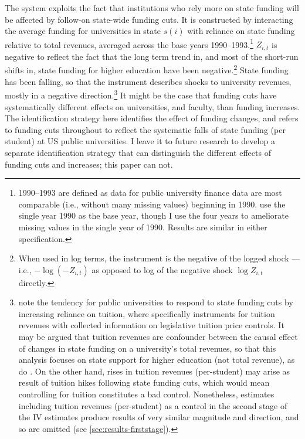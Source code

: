 The system exploits the fact that institutions who rely more on state funding will be affected by follow-on state-wide funding cuts.
It is constructed by interacting the average funding for universities in state $s(i)$ with reliance on state funding relative to total revenues, averaged across the base years 1990--1993.\footnote{
    1990--1993 are defined as data for public university finance data are most comparable (i.e., without many missing values) beginning in 1990.
    \cite{NBERw23736} use the single year 1990 as the base year, though I use the four years to ameliorate missing values in the single year of 1990.
    Results are similar in either specification.
}
$Z_{i,t}$ is negative to reflect the fact that the long term trend in, and most of the short-run shifts in, state funding for higher education have been negative.\footnote{
    When used in log terms, the instrument is the negative of the logged shock --- i.e., $- \log \left( -Z_{i,t} \right)$ as opposed to log of the negative shock $\log Z_{i,t}$ directly.
}
State funding has been falling, so that the instrument describes shocks to university revenues, mostly in a negative direction.\footnote{
    \label{foot:control}
    \cite{NBERw27885,webber2017state} note the tendency for public universities to respond to state funding cuts by increasing reliance on tuition, where \cite{NBERw23736} specifically instruments for tuition revenues with collected information on legislative tuition price controls.
    It may be argued that tuition revenues are confounder between the causal effect of changes in state funding on a university's total revenues, so that this analysis focuses on state support for higher education (not total revenue), as do \cite{NBERw27885}.
    On the other hand, rises in tuition revenues (per-student) may arise as result of tuition hikes following state funding cuts, which would mean controlling for tuition constitutes a bad control.
    Nonetheless, estimates including tuition revenues (per-student) as a control in the second stage of the IV estimates produce results of very similar magnitude and direction, and so are omitted (see \autoref{sec:results-firststage}).
}
It might be the case that funding cuts have systematically different effects on universities, and faculty, than funding increases.
The identification strategy here identifies the effect of funding changes, and refers to funding cuts throughout to reflect the systematic falls of state funding (per student) at US public universities.
I leave it to future research to develop a separate identification strategy that can distinguish the different effects of funding cuts and increases; this paper can not.

